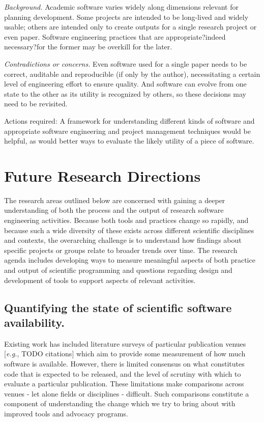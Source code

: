 \documentclass[a4paper,UKenglish]{dagman}
\newcommand{\eg}{\emph{e.g.},\xspace}
\begin{document}
\emph{Background.} Academic software varies widely along dimensions relevant for planning development. Some projects are intended to be long-lived and widely usable; others are intended only to create outputs for a single research project or even paper. Software engineering practices that are appropriate?indeed necessary?for the former may be overkill for the later. 

\emph{Contradictions or concerns.} Even software used for a single paper needs to be correct, auditable and reproducible (if only by the author), necessitating a certain level of engineering effort to ensure quality. And software can evolve from one state to the other as its utility is recognized by others, so these decisions may need to be revisited. 

Actions required: A framework for understanding different kinds of software and appropriate software engineering and project management techniques would be helpful, as would better ways to evaluate the likely utility of a piece of software. 



\section{Future Research Directions}

The research areas outlined below are concerned with gaining a deeper understanding of both the process and the output of research software engineering activities. Because both tools and practices change so rapidly, and because such a wide diversity of these exists across different scientific disciplines and contexts, the overarching challenge is to understand how findings about specific projects or groups relate to broader trends over time. The research agenda includes developing ways to measure meaningful aspects of both practice and output of scientific programming and questions regarding design and development of tools to support aspects of relevant activities.

\subsection{Quantifying the state of scientific software availability.}

Existing work has included literature surveys of particular publication venues [\eg TODO citations] which aim to provide some measurement of how much software is available. However, there is limited consensus on what constitutes code that is expected to be released, and the level of scrutiny with which to evaluate a particular publication. These limitations make comparisons across venues - let alone fields or disciplines - difficult. Such comparisons constitute a component of understanding the change which we try to bring about with improved tools and advocacy programs. 
\end{document}
